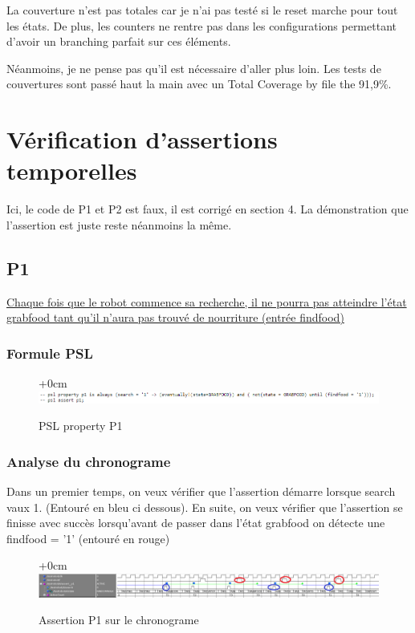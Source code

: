 \documentclass{article}
\newcommand{\sautligne}{
\textbf{\vspace{5mm}}
}
\begin{document}
La couverture n'est pas totales car je n'ai pas testé si le reset marche pour tout les états. De plus, les counters ne rentre pas dans les configurations permettant d'avoir un branching parfait sur ces éléments. 
\sautligne 

Néanmoins, je ne pense pas qu'il est nécessaire d'aller plus loin. Les tests de couvertures sont passé haut la main avec un Total Coverage by file the 91,9\%.

\newpage



\section{Vérification d'assertions temporelles}

Ici, le code de P1 et P2 est faux, il est corrigé en section 4. La démonstration que l'assertion est juste reste néanmoins la même.

\subsection{P1}
\uline{Chaque fois que le robot commence sa recherche, il ne pourra pas atteindre l'état 
grabfood tant qu'il n'aura pas trouvé de nourriture (entrée findfood)}

\subsubsection{Formule PSL }
\begin{figure}[!h]
\advance\leftskip+0cm
\includegraphics[scale=0.7]{PSL/P1.PNG}
\caption{PSL property P1}
\end{figure}

\subsubsection{Analyse du chronograme}
Dans un premier temps, on veux vérifier que l'assertion démarre lorsque search vaux 1. (Entouré en bleu ci dessous). 
En suite, on veux vérifier que l'assertion se finisse avec succès lorsqu'avant de passer dans l'état grabfood on détecte une findfood = '1' (entouré en rouge)

\begin{figure}[!h]
\advance\leftskip+0cm
\includegraphics[scale=0.6]{PSL/P1-1.PNG}
\caption{Assertion P1 sur le chronograme }
\end{figure}
\end{document}
